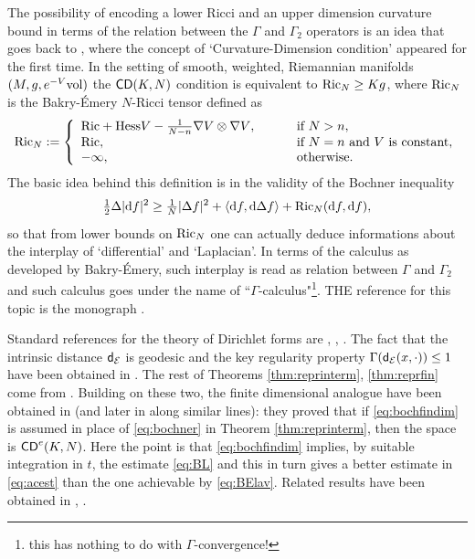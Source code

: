 \documentclass[11pt]{article}
\numberwithin{equation}{section}
\newcommand{\sfd}{{\sf d}}
\newcommand{\vol}{{\rm vol}}								%
\newcommand{\CD}{{\sf CD}}
\renewcommand{\d}{{\rm d}}
\newcommand{\Hess}{{\rm Hess}}
\newcommand\la{\langle}
\newcommand\ra{\rangle}
\begin{document}
{{The possibility of encoding a lower Ricci and an upper dimension curvature bound in terms of the relation between the $\Gamma$ and $\Gamma_2$ operators is an idea that goes back to \cite{BakryEmery85}, where the concept of `Curvature-Dimension condition' appeared for the first time. In the setting of smooth, weighted, Riemannian manifolds $(M,g,e^{-V}\vol)$ the $\CD(K,N)$ condition is equivalent to ${\rm Ric}_N\geq Kg$, where ${\rm Ric}_N$ is the Bakry-\'Emery $N$-Ricci tensor defined as
\begin{equation}
\label{eq:bern}
{\rm Ric}_N:=\left\{
\begin{array}{ll}
{\rm Ric}+\Hess V-\frac1{N-n}{\nabla V\otimes\nabla V},&\qquad\text{ if }N>n,\\
{\rm Ric},&\qquad\text{ if $N=n$ and $V$ is constant},\\
-\infty,&\qquad\text{ otherwise}.  
\end{array}
\right.
\end{equation}
The basic idea behind this definition is in the validity of the Bochner inequality
\[
\tfrac12\Delta|\d f|^2\geq \tfrac1N|\Delta f|^2+\la \d f,\d\Delta f\ra+{\rm Ric}_N(\d f,\d f),
\]
so that from lower bounds on ${\rm Ric}_N$ one can actually deduce informations about the interplay of `differential' and `Laplacian'. In terms of the calculus as developed by Bakry-\'Emery, such interplay is read as relation between $\Gamma$ and $\Gamma_2$ and such calculus   goes under the name of ``$\Gamma$-calculus"\footnote{this has nothing to do with $\Gamma$-convergence!}. THE reference for this topic is the monograph \cite{BakryGentilLedoux14}.

Standard references for the theory of Dirichlet forms are \cite{BH91}, \cite{MaRockner92}, \cite{Fuk80}. The fact  that  the intrinsic distance $\sfd_{\mathcal E}$ is geodesic and the key regularity property $\Gamma(\sfd_{\mathcal E}(x,\cdot))\leq 1$ have been obtained  in \cite{Sturm96I}. The rest of Theorems \ref{thm:reprinterm}, \ref{thm:reprfin} come from \cite{AmbrosioGigliSavare12}.  Building on these two, the finite dimensional analogue have been obtained in \cite{Erbar-Kuwada-Sturm13}  (and later in  \cite{AmbrosioMondinoSavare13} along similar lines): they proved that if \eqref{eq:bochfindim} is assumed in place of \eqref{eq:bochner} in Theorem \ref{thm:reprinterm}, then the space is $\CD^e(K,N)$. Here the point is that \eqref{eq:bochfindim} implies, by suitable integration in $t$, the estimate \eqref{eq:BL} and this in turn gives a better estimate in \eqref{eq:acest} than the one achievable by \eqref{eq:BElav}. Related results have been obtained in \cite{Koskela-Zhou12}, \cite{KSZ14}.

}}
\end{document}
